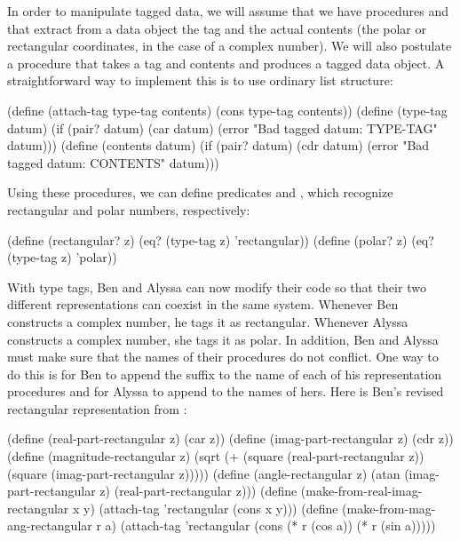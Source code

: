 In order to manipulate tagged data, we will assume that we have procedures
 and  that extract from a data object the tag and
the actual contents (the polar or rectangular coordinates, in the case of a
complex number).  We will also postulate a procedure  that
takes a tag and contents and produces a tagged data object.  A straightforward
way to implement this is to use ordinary list structure:

\begin{codeBlock}
(define (attach-tag type-tag contents)
  (cons type-tag contents))
(define (type-tag datum)
  (if (pair? datum)
      (car datum)
      (error "Bad tagged datum: TYPE-TAG" datum)))
(define (contents datum)
  (if (pair? datum)
      (cdr datum)
      (error "Bad tagged datum: CONTENTS" datum)))
\end{codeBlock}

\noindent
Using these procedures, we can define predicates   and
, which recognize rectangular and polar numbers, respectively:

\begin{codeBlock}
(define (rectangular? z)
  (eq? (type-tag z) 'rectangular))
(define (polar? z) (eq? (type-tag z) 'polar))
\end{codeBlock}

\noindent
With type tags, Ben and Alyssa can now modify their code so that their two
different representations can coexist in the same system.  Whenever Ben
constructs a complex number, he tags it as rectangular.  Whenever Alyssa
constructs a complex number, she tags it as polar.  In addition, Ben and Alyssa
must make sure that the names of their procedures do not conflict.  One way to
do this is for Ben to append the suffix  to the name of each
of his representation procedures and for Alyssa to append  to the
names of hers.  Here is Ben's revised rectangular representation from
:

\begin{codeBlock}
(define (real-part-rectangular z) (car z))
(define (imag-part-rectangular z) (cdr z))
(define (magnitude-rectangular z)
  (sqrt (+ (square (real-part-rectangular z))
           (square (imag-part-rectangular z)))))
(define (angle-rectangular z)
  (atan (imag-part-rectangular z)
        (real-part-rectangular z)))
(define (make-from-real-imag-rectangular x y)
  (attach-tag 'rectangular (cons x y)))
(define (make-from-mag-ang-rectangular r a)
  (attach-tag 'rectangular
              (cons (* r (cos a)) (* r (sin a)))))
\end{codeBlock}

